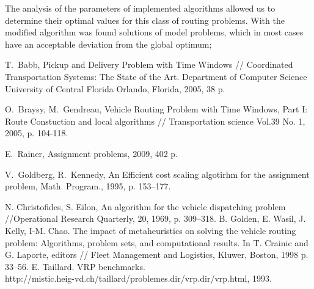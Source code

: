 \documentclass[]{TAACpaper}
\begin{document}
The analysis of the parameters of implemented algorithms allowed us to determine their optimal values for this class of routing problems. With the modified algorithm was found solutions of model problems, which in most cases have an acceptable deviation from the global optimum;


\begin{thebibliography}{99}

 T.~Babb, Pickup and Delivery Problem with Time Windows // Coordinated Transportation Systems: The State of the Art. Department of Computer Science University of Central Florida Orlando, Florida, 2005, 38 p.

 O.~Braysy, M.~Gendreau, Vehicle Routing Problem with Time Windows, Part I: Route Constuction and local algorithms // Transportation science Vol.39 No. 1, 2005, p. 104-118.

 E.~Rainer, Assignment problems, 2009, 402 p. 

 V.~Goldberg, R.~Kennedy, An Efficient cost scaling algotirhm for the assignment problem, Math. Program., 1995, p. 153--177.  

  N. Christofides, S. Eilon, An algorithm for the vehicle dispatching problem //Operational Research Quarterly, 20, 1969, p. 309–318.
  B. Golden, E. Wasil, J. Kelly, I-M. Chao. The impact of metaheuristics on solving the vehicle routing problem: Algorithms, problem sets, and computational results. In T. Crainic and G. Laporte, editors // Fleet Management and Logistics, Kluwer, Boston, 1998 p. 33–56.
  E. Taillard. VRP benchmarks.\\ http://mistic.heig-vd.ch/taillard/problemes.dir/vrp.dir/vrp.html, 1993.
\end{thebibliography}
\end{document}
